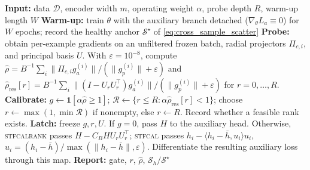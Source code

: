 \documentclass{article}
\begin{document}
\begin{algorithm}[h]
\caption{Released calibrated forward filters: radial \textsc{stfcal} and capped \textsc{stfcalrank}}
\label{alg:stfcal}
\begin{algorithmic}[1]
\STATE \textbf{Input:} data $\mathcal{D}$, encoder width $m$, operating weight $\alpha$, probe depth $R$, warm-up length $W$
\STATE \textbf{Warm-up:} train $\theta$ with the auxiliary branch detached ($\nabla_\theta L_a\equiv0$) for $W$ epochs; record the healthy anchor $\mathcal{S}^\star$ of \eqref{eq:cross_sample_scatter}
\STATE \textbf{Probe:} obtain per-example gradients on an unfiltered frozen batch, radial projectors $\Pi_{c,i}$, and principal basis $U$. With $\varepsilon=10^{-8}$, compute $\hat\rho=B^{-1}\sum_i\|\Pi_{c,i}g_a^{(i)}\|/(\|g_p^{(i)}\|+\varepsilon)$ and $\hat\rho_{\mathrm{res}}[r]=B^{-1}\sum_i\|(I-U_rU_r^\top)g_a^{(i)}\|/(\|g_p^{(i)}\|+\varepsilon)$ for $r=0,\ldots,R$.
\STATE \textbf{Calibrate:} $g\leftarrow\mathbf1[\alpha\hat\rho\ge1]$; $\mathcal R\leftarrow\{r\le R:\alpha\hat\rho_{\mathrm{res}}[r]<1\}$; choose $r\leftarrow\max(1,\min\mathcal R)$ if nonempty, else $r\leftarrow R$. Record whether a feasible rank exists.
\STATE \textbf{Latch:} freeze $g,r,U$. If $g=0$, pass $H$ to the auxiliary head. Otherwise, \textsc{stfcalrank} passes $H-C_BHU_rU_r^\top$; \textsc{stfcal} passes $h_i-\langle h_i-\bar h,u_i\rangle u_i$, $u_i=(h_i-\bar h)/\max(\|h_i-\bar h\|,\varepsilon)$. Differentiate the resulting auxiliary loss through this map.
\STATE \textbf{Report:} gate, $r$, $\hat\rho$, $\mathcal{S}_h/\mathcal{S}^\star$
\end{algorithmic}
\end{algorithm}
\end{document}
